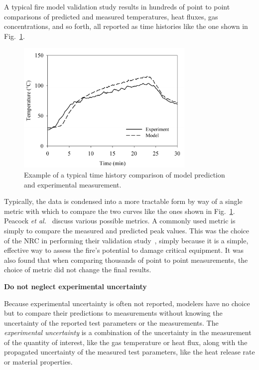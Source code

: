 \documentclass[fleqn,b5paper]{article}
\begin{document}
A typical fire model validation study results in hundreds of point to point comparisons of predicted and measured temperatures, heat fluxes, gas concentrations, and so forth, all reported as time histories like the one shown in Fig.~\ref{temp_history}.
\begin{figure}[ht]
\begin{center}
\includegraphics[height=2.5in]{../FDS_Validation_Guide/FIGURES/sample_time_history}
\end{center}
\caption[Sample time history plots.]{Example of a typical time history comparison of model prediction and experimental measurement.}
\label{temp_history}
\end{figure}
Typically, the data is condensed into a more tractable form by way of a single metric with which to compare the two curves like the ones shown in Fig.~\ref{temp_history}. Peacock {\em et al.}~\cite{Peacock:FSJ1999} discuss various possible metrics. A commonly used metric is simply to compare the measured and predicted peak values. This was the choice of the NRC in performing their validation study~\cite{NUREG_1824}, simply because it is a simple, effective way to assess the fire's potential to damage critical equipment. It was also found that when comparing thousands of point to point measurements, the choice of metric did not change the final results.


\vspace{\parskip}
{\bf Do not neglect experimental uncertainty}

Because experimental uncertainty is often not reported, modelers have no choice but to compare their predictions to measurements without knowing the uncertainty of the reported test parameters or the measurements. The {\em experimental uncertainty} is a combination of the uncertainty in the measurement of the quantity of interest, like the gas temperature or heat flux, along with the propagated uncertainty of the measured test parameters, like the heat release rate or material properties.
\end{document}
